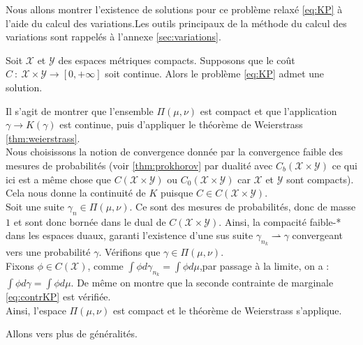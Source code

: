 \documentclass[a4paper,12pt]{article}
\begin{document}
Nous allons montrer l'existence de solutions pour ce problème relaxé \eqref{eq:KP} à l'aide du calcul des variations.Les outils principaux de la méthode du calcul des variations sont rappelés à l'annexe \ref{sec:variations}. 
\begin{theoreme}{}
Soit $\mathcal{X}$ et $\mathcal{Y}$ des espaces métriques compacts. Supposons que le coût $C\ :\ \mathcal{X}\times\mathcal{Y}\rightarrow [0,+\infty]$ soit continue. Alors le problème \eqref{eq:KP} admet une solution.
\end{theoreme}
\begin{preuve}
Il s'agit de montrer que l'ensemble $\Pi (\mu,\nu)$ est compact et que l'application $\gamma\rightarrow K(\gamma )$ est continue, puis d'appliquer le théorème de Weierstrass \eqref{thm:weierstrass}. \\
Nous choisissons la notion de convergence donnée par la convergence faible des mesures de probabilités (voir \eqref{thm:prokhorov} par dualité avec $C_b(\mathcal{X}\times\mathcal{Y})$ ce qui ici est a même chose que $C(\mathcal{X}\times\mathcal{Y})$ ou $C_0(\mathcal{X}\times\mathcal{Y})$ car $\mathcal{X}$ et $\mathcal{Y}$ sont compacts). Cela nous donne la continuité de $K$ puisque $C\in C(\mathcal{X}\times\mathcal{Y})$. \\

Soit une suite $\gamma_n\in\Pi (\mu,\nu )$. Ce sont des mesures de probabilités, donc de masse $1$ et sont donc bornée dans le dual de $C(\mathcal{X}\times\mathcal{Y})$. Ainsi, la compacité faible-* dans les espaces duaux, garanti l'existence d'une sus suite $\gamma_{n_k} \rightharpoonup \gamma$ convergeant vers une probabilité $\gamma$. 
Vérifions que $\gamma \in \Pi (\mu,\nu )$. \\
Fixons $\phi\in C(\mathcal{X})$, comme $\int\phi d\gamma_{n_k} =\int \phi d\mu $,par passage à la limite, on a : $\int\phi d\gamma =\int\phi d\mu$. De même on montre que la seconde contrainte de marginale \eqref{eq:contrKP} est vérifiée. \\
Ainsi, l'espace $\Pi(\mu,\nu)$ est compact et le théorème de Weierstrass s'applique.
\end{preuve}

Allons vers plus de généralités. 
\end{document}
